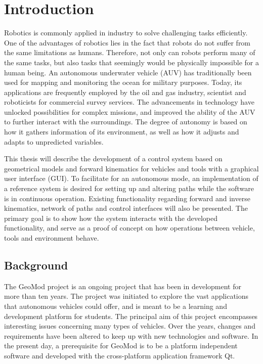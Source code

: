 \chapter{Introduction}

Robotics is commonly applied in industry to solve challenging tasks efficiently. One of the advantages of robotics lies in the fact that robots do not suffer from the same limitations as humans. Therefore, not only can robots perform many of the same tasks, but also tasks that seemingly would be physically impossible for a human being. An autonomous underwater vehicle (AUV) has traditionally been used for mapping and monitoring the ocean for military purposes. Today, its applications are frequently employed by the oil and gas industry, scientist and roboticists for commercial survey services. The advancements in technology have unlocked possibilities for complex missions, and improved the ability of the AUV to further interact with the surroundings. The degree of autonomy is based on how it gathers information of its environment, as well as how it adjusts and adapts to unpredicted variables.

This thesis will describe the development of a control system based on geometrical models and forward kinematics for vehicles and tools with a graphical user interface (GUI). To facilitate for an autonomous mode, an implementation of a reference system is desired for setting up and altering paths while the software is in continuous operation.
Existing functionality regarding forward and inverse kinematics, network of paths and control interfaces will also be presented. The primary goal is to show how the system interacts with the developed functionality, and serve as a proof of concept on how operations between vehicle, tools and environment behave.

\section{Background}

The GeoMod project is an ongoing project that has been in development for more than ten years. The project was initiated to explore the vast applications that autonomous vehicles could offer, and is meant to be a learning and development platform for students. The principal aim of this project encompasses interesting issues concerning many types of vehicles. Over the years, changes and requirements have been altered to keep up with new technologies and software. In the present day, a prerequisite for GeoMod is to be a platform independent software and developed with the cross-platform application framework Qt. 

